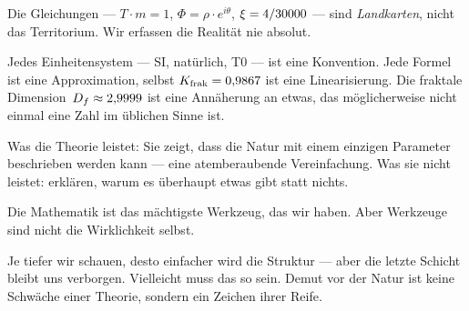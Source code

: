 Die Gleichungen --- $T \cdot m = 1$, $\Phi = \rho \cdot e^{i\theta}$, $\xi = 4/30000$ --- sind \emph{Landkarten}, nicht das Territorium. Wir erfassen die Realität nie absolut.

Jedes Einheitensystem --- SI, natürlich, T0 --- ist eine Konvention. Jede Formel ist eine Approximation, selbst $K_{\text{frak}} = 0{,}9867$ ist eine Linearisierung. Die fraktale Dimension~$D_f \approx 2{,}9999$ ist eine Annäherung an etwas, das möglicherweise nicht einmal eine Zahl im üblichen Sinne ist.

Was die Theorie leistet: Sie zeigt, dass die Natur mit einem einzigen Parameter beschrieben werden kann --- eine atemberaubende Vereinfachung. Was sie nicht leistet: erklären, warum es überhaupt etwas gibt statt nichts.

Die Mathematik ist das mächtigste Werkzeug, das wir haben. Aber Werkzeuge sind nicht die Wirklichkeit selbst.

\begin{kerngedanke}
Je tiefer wir schauen, desto einfacher wird die Struktur --- aber die letzte Schicht bleibt uns verborgen. Vielleicht muss das so sein. Demut vor der Natur ist keine Schwäche einer Theorie, sondern ein Zeichen ihrer Reife.
\end{kerngedanke}
